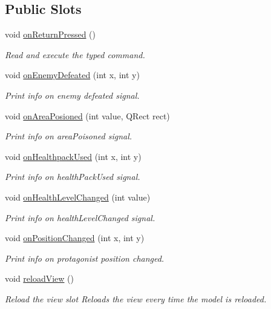 \subsection*{Public Slots}
\begin{DoxyCompactItemize}
\item 
void \hyperlink{classWorldTerminalView_abca57ada64d0d466fad4e48b26283ee7}{on\+Return\+Pressed} ()\hypertarget{classWorldTerminalView_abca57ada64d0d466fad4e48b26283ee7}{}\label{classWorldTerminalView_abca57ada64d0d466fad4e48b26283ee7}

\begin{DoxyCompactList}\small\item\em Read and execute the typed command. \end{DoxyCompactList}\item 
void \hyperlink{classWorldTerminalView_a39a7a5c66e6184474cf5e43182cca8df}{on\+Enemy\+Defeated} (int x, int y)
\begin{DoxyCompactList}\small\item\em Print info on enemy defeated signal. \end{DoxyCompactList}\item 
void \hyperlink{classWorldTerminalView_ab6ebb9b798c452dbb7bc6859e6c0082c}{on\+Area\+Posioned} (int value, Q\+Rect rect)
\begin{DoxyCompactList}\small\item\em Print info on area\+Poisoned signal. \end{DoxyCompactList}\item 
void \hyperlink{classWorldTerminalView_a9d400f81edbf0b5f6f2779a71311dadf}{on\+Healthpack\+Used} (int x, int y)
\begin{DoxyCompactList}\small\item\em Print info on health\+Pack\+Used signal. \end{DoxyCompactList}\item 
void \hyperlink{classWorldTerminalView_a754cab62b8dbff71fce179c1307fefde}{on\+Health\+Level\+Changed} (int value)
\begin{DoxyCompactList}\small\item\em Print info on health\+Level\+Changed signal. \end{DoxyCompactList}\item 
void \hyperlink{classWorldTerminalView_acce60911ae9ec49a2d25c9df3d0a4aa7}{on\+Position\+Changed} (int x, int y)
\begin{DoxyCompactList}\small\item\em Print info on protagonist position changed. \end{DoxyCompactList}\item 
void \hyperlink{classWorldTerminalView_ac2a90b7f75ef680dfc3acb5ee56e022a}{reload\+View} ()\hypertarget{classWorldTerminalView_ac2a90b7f75ef680dfc3acb5ee56e022a}{}\label{classWorldTerminalView_ac2a90b7f75ef680dfc3acb5ee56e022a}

\begin{DoxyCompactList}\small\item\em Reload the view slot Reloads the view every time the model is reloaded. \end{DoxyCompactList}\end{DoxyCompactItemize}
